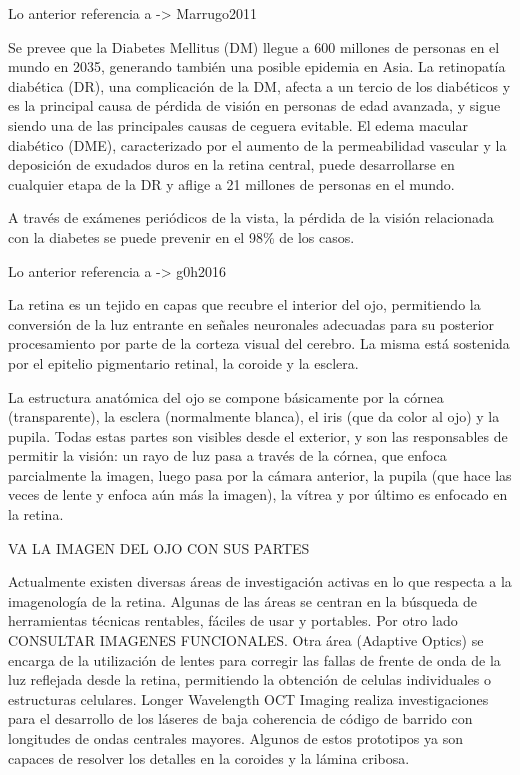 Lo anterior referencia a -> Marrugo2011

Se prevee que la Diabetes Mellitus (DM) llegue a 600 millones de personas en el mundo en 2035, generando tambi\'en una posible epidemia en Asia.
La retinopat\'ia diab\'etica (DR), una complicaci\'on de la DM, afecta a un tercio de los diab\'eticos  y es la principal causa de p\'erdida de visi\'on en personas de edad avanzada,  y sigue siendo una de las principales causas de ceguera evitable. El edema macular diab\'etico (DME), caracterizado por el aumento de la permeabilidad vascular y la deposici\'on de exudados duros en la retina central, puede desarrollarse en cualquier etapa de la DR y aflige a 21 millones de personas en el mundo.

A trav\'es de ex\'amenes peri\'odicos de la vista, la p\'erdida de la visi\'on relacionada con la diabetes se puede prevenir en el 98\% de los casos.

Lo anterior referencia a -> g0h2016

La retina es un tejido en capas que recubre el interior del ojo, permitiendo la conversión de la luz entrante en señales neuronales adecuadas para su posterior procesamiento por parte de la corteza visual del cerebro. La misma está sostenida por el epitelio pigmentario retinal, la coroide y la esclera.

La estructura anatómica del ojo se compone básicamente por la córnea (transparente), la esclera (normalmente blanca), el iris (que da color al ojo) y la pupila. Todas estas partes son visibles desde el exterior, y son las responsables de permitir la visión: un rayo de luz pasa a través de la córnea, que enfoca parcialmente la imagen, luego pasa por la cámara anterior, la pupila (que hace las veces de lente y enfoca aún más la imagen), la vítrea y por último es enfocado en la retina.

VA LA IMAGEN DEL OJO CON SUS PARTES


Actualmente existen diversas \'areas de investigación activas en lo que respecta a la imagenología de la retina. Algunas de las \'areas se centran en la b\'usqueda de herramientas t\'ecnicas rentables, f\'aciles de usar y portables. Por otro lado CONSULTAR IMAGENES FUNCIONALES. Otra \'area (Adaptive Optics) se encarga de la utilizaci\'on de lentes para corregir las fallas de frente de onda de la luz reflejada desde la retina, permitiendo la obtenci\'on de celulas individuales o estructuras celulares.
Longer Wavelength OCT Imaging realiza investigaciones para el desarrollo de los l\'aseres de baja coherencia de c\'odigo de barrido con longitudes de ondas centrales mayores. Algunos de estos prototipos ya son capaces de resolver los detalles en la coroides y la l\'amina cribosa.






